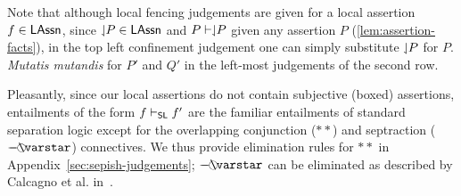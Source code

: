 Note that although local fencing judgements are given for a local assertion $\lass{f} \in \LAssertions$, since $\downharpoonleft\!\! P \in \mathsf{LAssn}$ and $P \vdash \downharpoonleft\!\! P$ given any assertion $P$ (\lem\ref{lem:assertion-facts}), in the top left confinement judgement one can simply substitute $\downharpoonleft\!\! P$ for $P$. \textit{Mutatis mutandis} for $P'$ and $Q'$ in the left-most judgements of the second row.

Pleasantly, since our local assertions do not contain subjective (boxed) assertions, entailments of the form $\lass{f} \slentails \lass{f'}$ are the familiar entailments of standard separation logic except for the overlapping conjunction ($**$) and septraction ($\septraction$) connectives. We thus provide elimination rules for $**$ in Appendix~\ref{sec:sepish-judgements}; $\septraction$ can be eliminated as described by Calcagno et al. in~\cite{vv07msc}.
%

